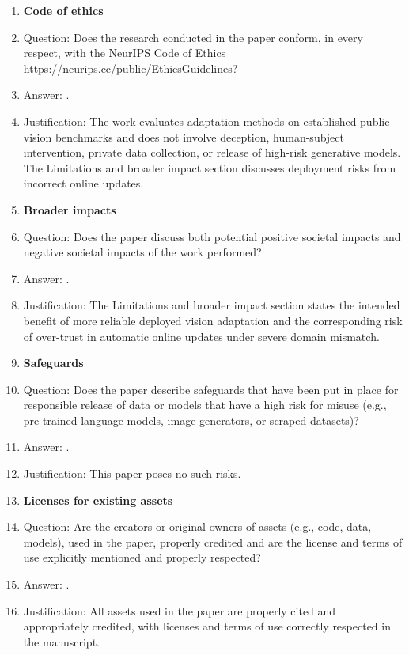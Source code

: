 \begin{enumerate}
\item {\bf Code of ethics}
    \item[] Question: Does the research conducted in the paper conform, in every respect, with the NeurIPS Code of Ethics \url{https://neurips.cc/public/EthicsGuidelines}?
    \item[] Answer: \answerYes{}.
    \item[] Justification: The work evaluates adaptation methods on established public vision benchmarks and does not involve deception, human-subject intervention, private data collection, or release of high-risk generative models. The Limitations and broader impact section discusses deployment risks from incorrect online updates.

\item {\bf Broader impacts}
    \item[] Question: Does the paper discuss both potential positive societal impacts and negative societal impacts of the work performed?
    \item[] Answer: \answerYes{}.
    \item[] Justification: The Limitations and broader impact section states the intended benefit of more reliable deployed vision adaptation and the corresponding risk of over-trust in automatic online updates under severe domain mismatch.

\item {\bf Safeguards}
    \item[] Question: Does the paper describe safeguards that have been put in place for responsible release of data or models that have a high risk for misuse (e.g., pre-trained language models, image generators, or scraped datasets)?
    \item[] Answer: \answerNA{}.
    \item[] Justification: This paper poses no such risks.

\item {\bf Licenses for existing assets}
    \item[] Question: Are the creators or original owners of assets (e.g., code, data, models), used in the paper, properly credited and are the license and terms of use explicitly mentioned and properly respected?
    \item[] Answer: \answerYes{}.
    \item[] Justification: All assets used in the paper are properly cited and appropriately credited, with
licenses and terms of use correctly respected in the manuscript.


\end{enumerate}
